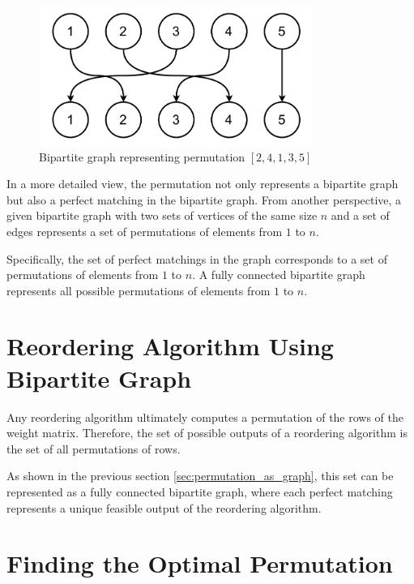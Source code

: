 \begin{figure}[h]
    \centerline{\includegraphics[width=0.8\textwidth]{images/permutation_graph}}
    \caption[Bipartite graph representing permutation]{Bipartite graph representing permutation $[2, 4, 1, 3, 5]$}
    \label{fig:permutation_graph}
\end{figure}

In a more detailed view, the permutation not only represents a bipartite graph but also a perfect matching in the bipartite graph. From another perspective, a given bipartite graph with two sets of vertices of the same size $n$ and a set of edges represents a set of permutations of elements from $1$ to $n$.

Specifically, the set of perfect matchings in the graph corresponds to a set of permutations of elements from $1$ to $n$. A fully connected bipartite graph represents all possible permutations of elements from $1$ to $n$.

\section{Reordering Algorithm Using Bipartite Graph}

Any reordering algorithm ultimately computes a permutation of the rows of the weight matrix. Therefore, the set of possible outputs of a reordering algorithm is the set of all permutations of rows.

As shown in the previous section \ref{sec:permutation_as_graph}, this set can be represented as a fully connected bipartite graph, where each perfect matching represents a unique feasible output of the reordering algorithm.

\section{Finding the Optimal Permutation}

